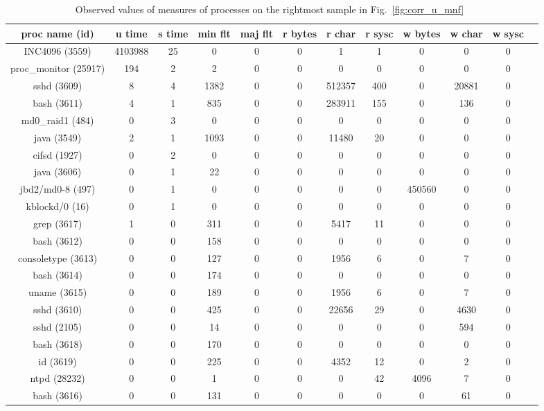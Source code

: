 \begin{table}[htp!]
\begin{center}
\begin{tabular}{|c|c|c|c|c|c|c|c|c|c|c|c|} \hline
proc name (id) & u time & s time & min flt & maj flt & r bytes & r char & r sysc & w bytes & w char & w sysc\\ \hline
INC4096 (3559) & 4103988 & 25 & 0 & 0 & 0 & 1 & 1 & 0 & 0 & 0 \\ \hline
proc\_monitor  (25917)  & 194 & 2 & 2 & 0 & 0 & 0 & 0 & 0 & 0 & 0 \\ \hline
sshd (3609) & 8 & 4 & 1382 & 0 & 0 & 512357 & 400 & 0 & 20881 & 0 \\ \hline
bash (3611)  & 4 & 1 & 835 & 0 & 0 & 283911 & 155 & 0 & 136 & 0 \\ \hline
md0\_raid1 (484) & 0 & 3 & 0 & 0 & 0 & 0 & 0 & 0 & 0 & 0 \\ \hline
java (3549) & 2 & 1 & 1093 & 0 & 0 & 11480 & 20 & 0 & 0 & 0 \\ \hline
cifsd (1927) & 0 & 2 & 0 & 0 & 0 & 0 & 0 & 0 & 0 & 0 \\ \hline
java (3606) & 0 & 1 & 22 & 0 & 0 & 0 & 0 & 0 & 0 & 0 \\ \hline
jbd2/md0-8 (497) & 0 & 1 & 0 & 0 & 0 & 0 & 0 & 450560 & 0 & 0 \\ \hline
kblockd/0 (16) & 0 & 1 & 0 & 0 & 0 & 0 & 0 & 0 & 0 & 0 \\ \hline
grep (3617) & 1 & 0 & 311 & 0 & 0 & 5417 & 11 & 0 & 0 & 0 \\ \hline
bash (3612) & 0 & 0 & 158 & 0 & 0 & 0 & 0 & 0 & 0 & 0 \\ \hline
consoletype (3613) & 0 & 0 & 127 & 0 & 0 & 1956 & 6 & 0 & 7 & 0 \\ \hline
bash (3614) & 0 & 0 & 174 & 0 & 0 & 0 & 0 & 0 & 0 & 0 \\ \hline
uname (3615) & 0 & 0 & 189 & 0 & 0 & 1956  & 6 & 0 & 7 & 0 \\ \hline
sshd (3610) & 0 & 0 & 425 & 0 & 0 & 22656 & 29 & 0 & 4630 & 0 \\ \hline
sshd (2105) & 0 & 0 & 14 & 0 & 0 & 0 & 0 & 0 & 594 & 0 \\ \hline
bash (3618) & 0 & 0 & 170 & 0 & 0 & 0 & 0 & 0 & 0 & 0 \\ \hline
id (3619) & 0 & 0 & 225 & 0 & 0 & 4352 & 12 & 0 & 2 & 0 \\ \hline
ntpd (28232) & 0 & 0 & 1 & 0 & 0 & 0 & 42 & 4096 & 7 & 0 \\ \hline
bash (3616) & 0 & 0 & 131 & 0 & 0 & 0 & 0 & 0 & 61 & 0 \\ \hline
\end{tabular}
\end{center}
\caption{Observed values of measures of processes on the rightmost sample in Fig.~\ref{fig:corr_u_mnf}~\label{tab:breakdown1}}
\end{table}


